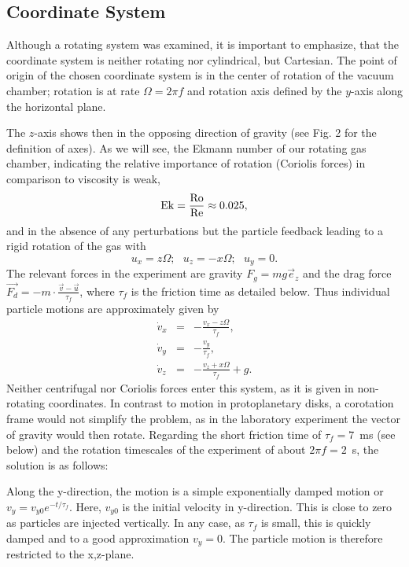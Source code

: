 \subsection{Coordinate System}
Although a rotating system was examined, it is important to emphasize, that the coordinate system is neither rotating nor cylindrical, but Cartesian. The point of origin of the chosen coordinate system is in the center of rotation of the vacuum chamber; {rotation is at rate $\Omega = 2 \pi f$ and rotation axis defined by} the $y$-axis along the horizontal plane. {The $z$-axis shows then in the opposing direction of gravity (see Fig. 2 for the definition of axes). As we will see, the Ekmann number of our rotating gas chamber, indicating the relative importance of rotation (Coriolis forces) in comparison to viscosity is weak, 
\begin{equation}
{\rm Ek} = \frac{\rm Ro}{\rm Re} \approx 0.025,
\end{equation}
and in the absence of any perturbations but the particle feedback leading to a rigid rotation of the
gas with
\begin{equation}
u_x = z \Omega; \,\,\,\, u_z = - x \Omega; \,\,\,\, u_y = 0.
\end{equation}
The relevant forces in the experiment are gravity $F_g = m g \vec{e}_z$ and the drag force $\vec{F_d} = - m \cdot \frac{\vec{v}-\vec{u}}{\tau_f}$, where $\tau_f$ is the friction time as detailed below. Thus individual particle motions are
approximately given by
\begin{eqnarray}
\dot v_x &=& - \frac{v_x - z \Omega}{\tau_f},\\
\dot v_y &=& - \frac{v_y}{\tau_f}, \\
\dot v_z &=& - \frac{v_z + x \Omega}{\tau_f} + g.
\end{eqnarray}
Neither centrifugal nor Coriolis forces enter this system, as it is given in non-rotating coordinates.
{In contrast to motion in protoplanetary disks, a corotation frame would not simplify the problem, as in the laboratory experiment the vector of gravity would then rotate.
Regarding the short friction time of $\tau_f=7$~ms (see below) and the rotation timescales of the experiment of about $2 \pi f = 2$~s, the solution is as follows:}

{Along the y-direction, the motion is a simple exponentially damped motion or $v_y = v_{y0} e^{-t/\tau_f }$. Here, $v_{y0}$ is the initial velocity in y-direction. This is close to zero as particles are injected vertically. In any case, as $\tau_f$ is small, this is quickly damped and to a good approximation $v_y = 0$. The particle motion is therefore restricted to the x,z-plane.}

}
